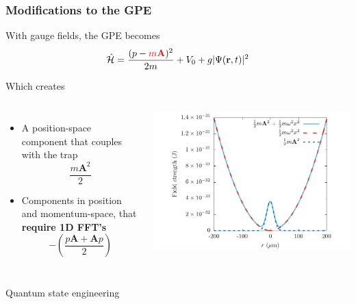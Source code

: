\documentclass{beamer}
\begin{document}
\begin{frame}
\frametitle{Modifications to the GPE}
With gauge fields, the GPE becomes
\begin{equation*}
\mathcal{\hat H} = \frac{(p-{\color{red}{m\mathbf{A}}} )^2}{2m} + V_0 + g|\Psi(\mathbf{r},t)|^2
\end{equation*}

Which creates

\begin{columns}
\begin{itemize}
\item A position-space component that couples with the trap
$$
\frac{m\mathbf{A}^2}{2}
$$

\item Components in position and momentum-space, that \textbf{require 1D FFT's}
$$
-\left(\frac{p\mathbf{A} + \mathbf{A}p}{2}\right)
$$
\end{itemize}
\includegraphics[width=1.1\textwidth]{../data/splitop/gauge/check.pdf}
\end{columns}

\end{frame}

\begin{frame}
\center \huge Quantum state engineering
\end{frame}
\end{document}
